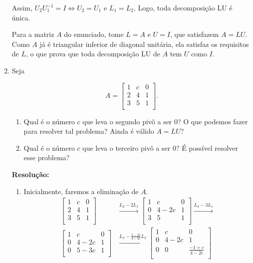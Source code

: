 \documentclass[leqno]{article}
\begin{document}
\begin{enumerate}
    Assim, $U_2U_1^{-1}=I\iff U_2=U_1$ e $L_1=L_2$. Logo, toda decomposição LU é única.
    
    Para a matriz $A$ do enunciado, tome $L=A$ e $U=I$, que satisfazem $A=LU$. Como $A$ já é triangular inferior de diagonal unitária, ela satisfaz os requisitos de $L$, o que prova que toda decomposição LU de $A$ tem $U$ como $I$.
    
    \item Seja
    
    $$A=\begin{bmatrix}
    1 & c & 0\\
    2 & 4 & 1\\
    3 & 5 & 1\\
    \end{bmatrix}\text{.}$$
    
    \begin{enumerate}
        \item Qual é o número $c$ que leva o segundo pivô a ser $0$? O que podemos fazer para resolver tal problema? Ainda é válido $A=LU$?
        \item Qual é o número $c$ que leva o terceiro pivô a ser $0$? É possível resolver esse problema?
    \end{enumerate}
    
    \textbf{Resolução:}
    
    \begin{enumerate}
        \item Inicialmente, faremos a eliminação de $A$.
        \begin{align*}
            \begin{bmatrix}
            1 & c & 0\\
            2 & 4 & 1\\
            3 & 5 & 1\\
            \end{bmatrix}&\xrightarrow{L_2-2L_1}\begin{bmatrix}
            1 & c & 0\\
            0 & 4-2c & 1\\
            3 & 5 & 1\\
            \end{bmatrix}\xrightarrow{L_3-3L_1}\\
            \begin{bmatrix}
            1 & c & 0\\
            0 & 4-2c & 1\\
            0 & 5-3c & 1\\
            \end{bmatrix}&\xrightarrow{L_3-\frac{5-3c}{4-2c}L_2}\begin{bmatrix}
            1 & c & 0\\
            0 & 4-2c & 1\\
            0 & 0 & \frac{-1+c}{4-2c}\\
            \end{bmatrix}
        \end{align*}
        

\end{enumerate}
\end{enumerate}
\end{document}
